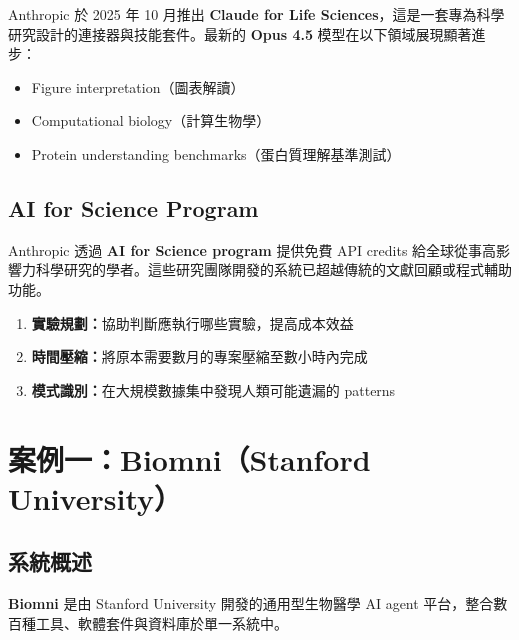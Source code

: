 \documentclass[12pt,a4paper]{article}
\begin{document}
Anthropic 於 2025 年 10 月推出 \textbf{Claude for Life Sciences}，這是一套專為科學研究設計的連接器與技能套件。最新的 \textbf{Opus 4.5} 模型在以下領域展現顯著進步：

\begin{itemize}
    \item Figure interpretation（圖表解讀）
    \item Computational biology（計算生物學）
    \item Protein understanding benchmarks（蛋白質理解基準測試）
\end{itemize}

\subsection{AI for Science Program}

Anthropic 透過 \textbf{AI for Science program} 提供免費 API credits 給全球從事高影響力科學研究的學者。這些研究團隊開發的系統已超越傳統的文獻回顧或程式輔助功能。

\begin{tcolorbox}[
    colback=emergency_blue!5!white,
    colframe=emergency_blue,
    title=\textbf{Claude 作為研究協作者的三大角色},
    fonttitle=\bfseries
]
\begin{enumerate}
    \item \textbf{實驗規劃：}協助判斷應執行哪些實驗，提高成本效益
    \item \textbf{時間壓縮：}將原本需要數月的專案壓縮至數小時內完成
    \item \textbf{模式識別：}在大規模數據集中發現人類可能遺漏的 patterns
\end{enumerate}
\end{tcolorbox}

\section{案例一：Biomni（Stanford University）}

\subsection{系統概述}

\textbf{Biomni} 是由 Stanford University 開發的通用型生物醫學 AI agent 平台，整合數百種工具、軟體套件與資料庫於單一系統中。
\end{document}
